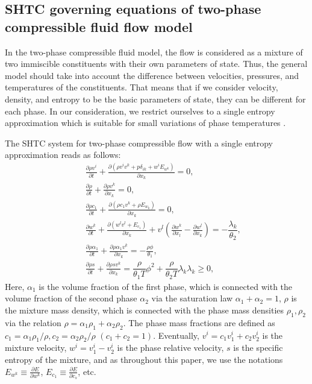 \documentclass[3p,times,table]{article}
\newcommand{\pd}{\partial}
\begin{document}
\subsection{SHTC governing equations of two-phase compressible fluid flow model}
\label{sec.twophase}

In the two-phase compressible fluid model, the flow is considered  
as a mixture of two 
immiscible constituents with their own parameters of state. Thus, the general model should take into 
account the difference between velocities, pressures, and temperatures of the 
constituents. That means that if 
we consider  velocity, density, and entropy to be the basic parameters of 
state, they can be 
different for each phase. In our consideration, we restrict ourselves to a 
single entropy 
approximation which is suitable for small variations of phase temperatures 
\cite{Romenski2016}.

The SHTC system for two-phase compressible flow with a single entropy approximation 
\cite{RomDrikToro2010} reads as follows:
\begin{subequations}\label{eqn.HPRFF}
\begin{eqnarray}
&&\displaystyle\frac{\partial \rho v^i}{\partial t}+\frac{\partial 
	(\rho v^i v^k + p \delta_{ik} + w^iE_{w^k} )}{\partial x_k}=0, 
\label{eqn.momentumFF}\\[2mm]
&& \frac{\partial \rho}{\partial t}+\frac{\partial \rho v^k}{\partial 
	x_k}=0,\label{eqn.contiFF}\\[2mm]
&& \frac{\partial \rho c_1}{\partial t}+\frac{\partial (\rho c_1 v^k+\rho E_{w_k})}{\partial 
	x_k}=0,\label{eqn.contiFF1}\\[2mm]
&&\displaystyle\frac{\partial w^k}{\partial t}+\frac{\partial(w^lv^l+E_{c_1})}{\partial x_k}+v^l\left(\frac{\partial w^k}{\partial x_l}-
\frac{\partial w^l}{\partial x_k}\right)=-\dfrac{ \lambda_{k} }{\theta_2},\label{eqn.relvel}\\[2mm]
&& \frac{\partial \rho \alpha_1}{\partial t}+\frac{\partial \rho \alpha_1 v^k }{\partial x_k}=-\frac{\rho \phi}{\theta_1},\label{eqn.alphaFF}\\[2mm]
&&\displaystyle\frac{\partial \rho s}{\partial t}+\frac{\partial \rho 
	s v^k }{\partial x_k}=\dfrac{\rho}{\theta_1 T}\phi^2 +
\dfrac{\rho}{\theta_2 T}\lambda_k \lambda_k \geq0, 
\label{eqn.entropyFF}
\end{eqnarray}
\end{subequations}
Here, $\alpha_1$ is the volume fraction of the first phase, which is connected 
with the volume 
fraction of the second phase $\alpha_2$ via the saturation law 
$\alpha_1+\alpha_2=1$, $\rho$ is the mixture mass density, which is connected 
with the phase mass densities $\rho_1,\rho_2$ via the relation 
$\rho=\alpha_1\rho_1+\alpha_2\rho_2$. The phase mass fractions are defined as 
$c_1=\alpha_1 \rho_1/\rho, c_2=\alpha_2 \rho_2/\rho$  $(c_1+c_2=1)$. 
Eventually, 
$v^i=c_1v_1^i+c_2v_2^i$ is the mixture velocity, $w^i=v_1^i-v_2^i$ is the 
phase relative velocity, $s$ is the specific entropy of the mixture, and as 
throughout this paper, we use the notations $ E_{w^k} \equiv \frac{\pd E}{\pd 
w^k} $, $ E_{c_1} 
\equiv \frac{\pd E}{\pd c_s} $, etc.
\end{document}
